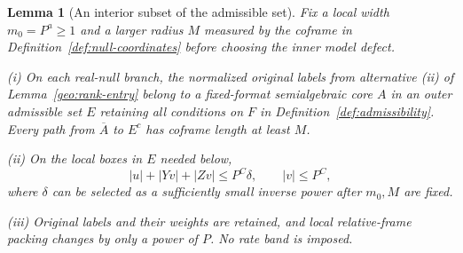 \documentclass[11pt]{amsart}
\newtheorem{lemma}[theorem]{Lemma}
\theoremstyle{definition}
\theoremstyle{remark}
\numberwithin{equation}{section}
\begin{document}
\begin{lemma}[An interior subset of the admissible set]\label{geo:core}
Fix a local width $m_0=P^a\ge1$ and a larger radius $M$ measured by the coframe in Definition~\ref{def:null-coordinates} before choosing the inner model defect.

\noindent\textup{(i)} On each real-null branch, the normalized original labels from alternative \textup{(ii)} of Lemma~\ref{geo:rank-entry} belong to a fixed-format semialgebraic core $A$ in an outer admissible set $E$ retaining all conditions on $F$ in Definition~\ref{def:admissibility}. Every path from $\overline A$ to $E^c$ has coframe length at least $M$.

\noindent\textup{(ii)} On the local boxes in $E$ needed below,
\begin{equation}\label{geo:small-rates}
|u|+|Yv|+|Zv|\le P^C\delta,\qquad |v|\le P^C,
\end{equation}
where $\delta$ can be selected as a sufficiently small inverse power after $m_0,M$ are fixed.

\noindent\textup{(iii)} Original labels and their weights are retained, and local relative-frame packing changes by only a power of $P$. No rate band is imposed.
\end{lemma}
\end{document}
